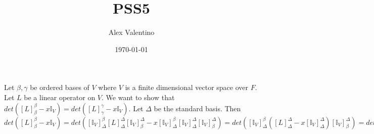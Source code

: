 \documentclass[12pt, letterpaper]{article}
\date{\today}
\author{Alex Valentino}
\title{PSS5}
\begin{document}
	Let $\beta, \gamma$ be ordered bases of $V$ where $V$ is a finite dimensional vector space over $F$.  Let $L$ be a linear operator on $V$.  We want to show that $det([L]_\beta^\beta - x \mathbb{I}_V) = det([L]_\gamma^\gamma - x \mathbb{I}_V)$.  Let $\Delta$ be the standard basis.  Then $det([L]_\beta^\beta - x \mathbb{I}_V) = det([\mathbb{I}_V]^\beta_\Delta [L]_\Delta^\Delta[\mathbb{I}_V]^\Delta_\beta - x [\mathbb{I}_V]^\beta_\Delta [\mathbb{I}_V]_\Delta^\Delta[\mathbb{I}_V]^\Delta_\beta) = det([\mathbb{I}_V]^\beta_\Delta ([L]_\Delta^\Delta - x [\mathbb{I}_V]_\Delta^\Delta) [\mathbb{I}_V]^\Delta_\beta) = det([\mathbb{I}_V]^\beta_\Delta)det([L]_\Delta^\Delta - x [\mathbb{I}_V]_\Delta^\Delta) det([\mathbb{I}_V]^\Delta_\beta)$  
\end{document}
